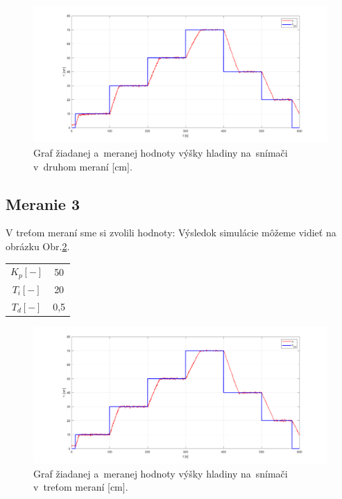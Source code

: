 \documentclass{article}
\begin{document}
\begin{figure}[!htbp]
	\begin{center}
		\includegraphics[width=\textwidth]{./include/meranie2.png}
	\end{center}
	\caption{Graf žiadanej a~meranej hodnoty výšky hladiny na~snímači v~druhom meraní [cm].}
	\label{fig:m2}
\end{figure}

\clearpage

\subsection{Meranie 3}
\label{sec:meranie3}

V treťom meraní sme si zvolili hodnoty: 
Výsledok simulácie môžeme vidieť na obrázku Obr.\ref{fig:m3}.

\begin{center}
\begin{tabular}{ |c|c| }
 \hline
 $K_p [-]$ & 50 \\
 $T_i [-]$ & 20 \\
 $T_d [-]$ & 0,5 \\
 \hline
\end{tabular}
\end{center}


\begin{figure}[!htbp]
	\begin{center}
		\includegraphics[width=\textwidth]{./include/meranie3.png}
	\end{center}
	\caption{Graf žiadanej a~meranej hodnoty výšky hladiny na~snímači v~treťom meraní [cm].}
	\label{fig:m3}
\end{figure}
\end{document}
